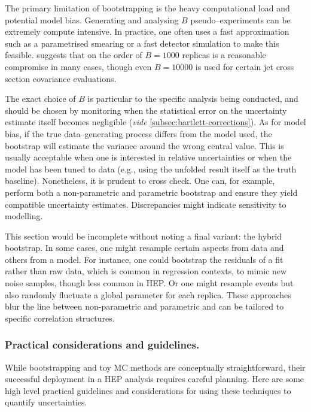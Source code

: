         The primary limitation of bootstrapping is the heavy computational load and potential model bias.
        Generating and analysing $B$ pseudo--experiments can be extremely compute intensive.
        In practice, one often uses a fast approximation such as a parametrised smearing or a fast detector simulation to make this feasible.
        \cite{noauthor_evaluating_2021} suggests that on the order of $B=1000$ replicas is a reasonable compromise in many cases, though even $B=10000$ is used for certain jet cross section covariance evaluations.
        
        The exact choice of $B$ is particular to the specific analysis being conducted, and should be chosen by monitoring when the statistical error on the uncertainty estimate itself becomes negligible (\textit{vide} \cref{subsec:bartlett-corrections}).
        As for model bias, if the true data--generating process differs from the model used, the bootstrap will estimate the variance around the wrong central value.
        This is usually acceptable when one is interested in relative uncertainties or when the model has been tuned to data (e.g., using the unfolded result itself as the truth baseline).
        Nonetheless, it is prudent to cross check.
        One can, for example, perform both a non-parametric and parametric bootstrap and ensure they yield compatible uncertainty estimates.
        Discrepancies might indicate sensitivity to modelling.

        This section would be incomplete without noting a final variant: the hybrid bootstrap.
        In some cases, one might resample certain aspects from data and others from a model.
        For instance, one could bootstrap the residuals of a fit rather than raw data, which is common in regression contexts, to mimic new noise samples, though less common in HEP.
        Or one might resample events but also randomly fluctuate a global parameter for each replica.
        These approaches blur the line between non-parametric and parametric and can be tailored to specific correlation structures.

    \subsubsection{Practical considerations and guidelines.}
        While bootstrapping and toy MC methods are conceptually straightforward, their successful deployment in a HEP analysis requires careful planning.
        Here are some high level practical guidelines and considerations for using these techniques to quantify uncertainties.
